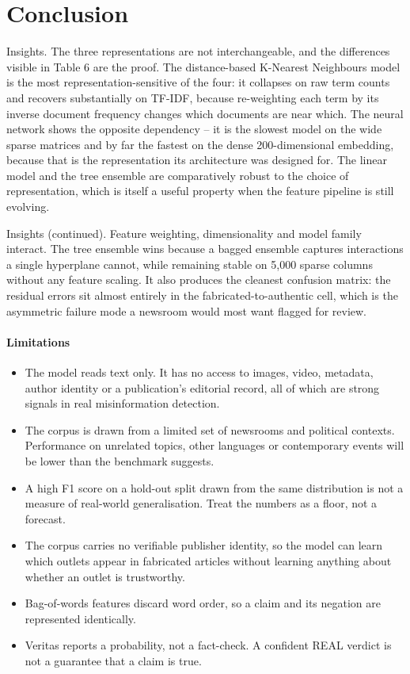 \documentclass[conference,a4paper]{IEEEtran}
\begin{document}
\section{Conclusion}

Insights. The three representations are not interchangeable, and the differences visible in Table 6 are the proof. The distance-based K-Nearest Neighbours model is the most representation-sensitive of the four: it collapses on raw term counts and recovers substantially on TF-IDF, because re-weighting each term by its inverse document frequency changes which documents are near which. The neural network shows the opposite dependency -- it is the slowest model on the wide sparse matrices and by far the fastest on the dense 200-dimensional embedding, because that is the representation its architecture was designed for. The linear model and the tree ensemble are comparatively robust to the choice of representation, which is itself a useful property when the feature pipeline is still evolving.

Insights (continued). Feature weighting, dimensionality and model family interact. The tree ensemble wins because a bagged ensemble captures interactions a single hyperplane cannot, while remaining stable on 5,000 sparse columns without any feature scaling. It also produces the cleanest confusion matrix: the residual errors sit almost entirely in the fabricated-to-authentic cell, which is the asymmetric failure mode a newsroom would most want flagged for review.

\paragraph{Limitations}

\begin{itemize}
  \item The model reads text only. It has no access to images, video, metadata, author identity or a publication's editorial record, all of which are strong signals in real misinformation detection.
  \item The corpus is drawn from a limited set of newsrooms and political contexts. Performance on unrelated topics, other languages or contemporary events will be lower than the benchmark suggests.
  \item A high F1 score on a hold-out split drawn from the same distribution is not a measure of real-world generalisation. Treat the numbers as a floor, not a forecast.
  \item The corpus carries no verifiable publisher identity, so the model can learn which outlets appear in fabricated articles without learning anything about whether an outlet is trustworthy.
  \item Bag-of-words features discard word order, so a claim and its negation are represented identically.
  \item Veritas reports a probability, not a fact-check. A confident REAL verdict is not a guarantee that a claim is true.
\end{itemize}
\end{document}

